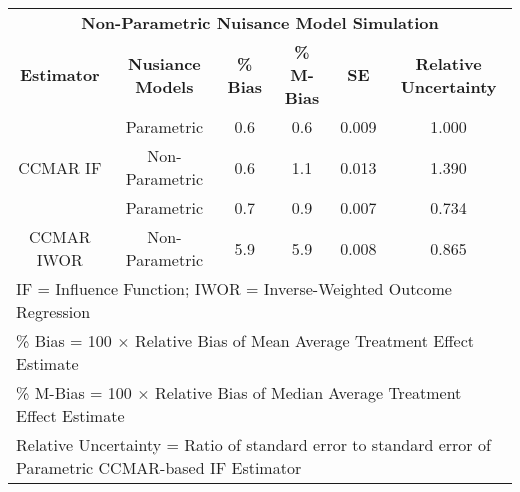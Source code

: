 \begin{table}
\centering
\begin{tabular}[ht]{|>{}c|c|c|c|c|>{}c|}
\hline
\multicolumn{6}{|c|}{\textbf{Non-Parametric Nuisance Model Simulation}} \\
\cline{1-6}
\textbf{Estimator} & \textbf{Nusiance Models} & \textbf{\% Bias} & \textbf{\% M-Bias} & \textbf{SE} & \textbf{Relative Uncertainty}\\
\hline
 & Parametric & 0.6 & 0.6 & 0.009 & 1.000\\
\cline{2-6}
\multirow{-2}{*}{\centering\arraybackslash CCMAR IF} & Non-Parametric & 0.6 & 1.1 & 0.013 & 1.390\\
\cline{1-6}
 & Parametric & 0.7 & 0.9 & 0.007 & 0.734\\
\cline{2-6}
\multirow{-2}{*}{\centering\arraybackslash CCMAR IWOR} & Non-Parametric & 5.9 & 5.9 & 0.008 & 0.865\\
\hline
\multicolumn{6}{l}{\rule{0pt}{1em}IF = Influence Function; IWOR = Inverse-Weighted Outcome Regression}\\
\multicolumn{6}{l}{\rule{0pt}{1em}\% Bias = 100 $\times$ Relative Bias of Mean Average Treatment Effect Estimate}\\
\multicolumn{6}{l}{\rule{0pt}{1em}\% M-Bias = 100 $\times$ Relative Bias of Median Average Treatment Effect Estimate}\\
\multicolumn{6}{l}{\rule{0pt}{1em}Relative Uncertainty = Ratio of standard error to standard error of Parametric CCMAR-based IF Estimator}\\
\end{tabular}
\end{table}\label{table:results_ff}
